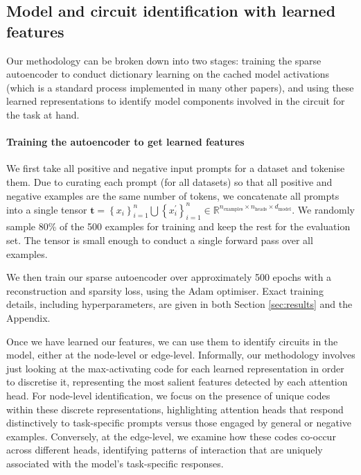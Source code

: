 \documentclass[11pt]{scrartcl}
\begin{document}
\subsection{Model and circuit identification with learned features}

Our methodology can be broken down into two stages: training the sparse autoencoder to conduct dictionary learning on the cached model activations (which is a standard process implemented in many other papers), and using these learned representations to identify model components involved in the circuit for the task at hand.

\paragraph{Training the autoencoder to get learned features}
We first take all positive and negative input prompts for a dataset and tokenise them. Due to curating each prompt (for all datasets) so that all positive and negative examples are the same number of tokens, we concatenate all prompts into a single tensor $\mathbf{t} = \left\{x_i\right\}_{i=1}^n \bigcup \left\{x_i^\prime\right\}_{i=1}^n \in \mathbb{R}^{n_\text{examples}\times n_\text{heads} \times d_\text{model}}$. We randomly sample 80\% of the 500 examples for training and keep the rest for the evaluation set. The tensor is small enough to conduct a single forward pass over all examples.

We then train our sparse autoencoder over approximately 500 epochs with a reconstruction and sparsity loss, using the Adam optimiser. Exact training details, including hyperparameters, are given in both Section \ref{sec:results} and the Appendix.


Once we have learned our features, we can use them to identify circuits in the model, either at the node-level or edge-level. Informally, our methodology involves just looking at the max-activating code for each learned representation in order to discretise it, representing the most salient features detected by each attention head. For node-level identification, we focus on the presence of unique codes within these discrete representations, highlighting attention heads that respond distinctively to task-specific prompts versus those engaged by general or negative examples. Conversely, at the edge-level, we examine how these codes co-occur across different heads, identifying patterns of interaction that are uniquely associated with the model's task-specific responses.
\end{document}

